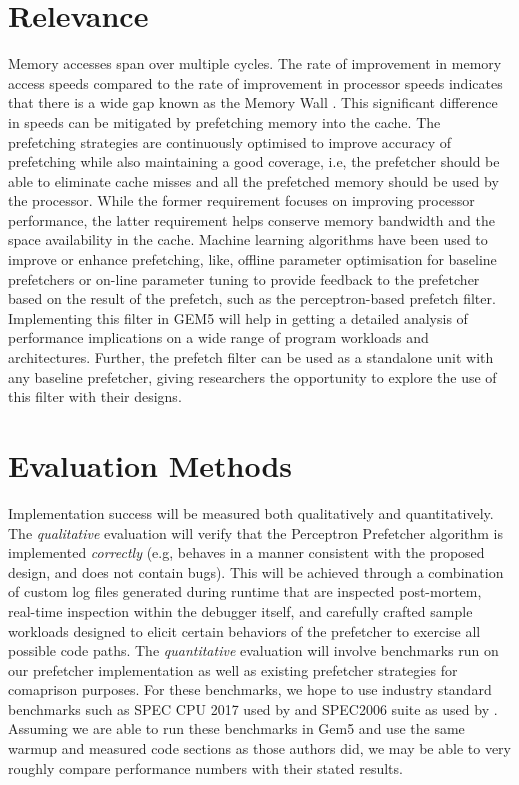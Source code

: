 \documentclass[conference]{IEEEtran}
\begin{document}
\section{Relevance}
Memory accesses span over multiple cycles. The rate of improvement in memory access speeds compared to the rate of improvement in processor speeds indicates that there is a wide gap known as the Memory Wall \cite{mem-wall}. This significant difference in speeds can be mitigated by prefetching memory into the cache. The prefetching strategies are continuously optimised to improve accuracy of prefetching while also maintaining a good coverage, i.e, the prefetcher should be able to eliminate cache misses and all the prefetched memory should be used by the processor. While the former requirement focuses on improving processor performance, the latter requirement helps conserve memory bandwidth and the space availability in the cache. Machine learning algorithms have been used to improve or enhance prefetching, like, offline parameter optimisation for baseline prefetchers or on-line parameter tuning to provide feedback to the prefetcher based on the result of the prefetch, such as the perceptron-based prefetch filter\cite{ppf}. Implementing this filter in GEM5 will help in getting a detailed analysis of performance implications on a wide range of program workloads and architectures.  Further, the prefetch filter can be used as a standalone unit with any baseline prefetcher, giving researchers the opportunity to explore the use of this filter with their designs.

\section{Evaluation Methods}

Implementation success will be measured both qualitatively and quantitatively. The \textit{qualitative} evaluation will verify that the Perceptron Prefetcher algorithm is implemented \textit{correctly} (e.g, behaves in a manner consistent with the proposed design, and does not contain bugs). This will be achieved through a combination of custom log files generated during runtime that are inspected post-mortem, real-time inspection within the debugger itself, and carefully crafted sample workloads designed to elicit certain behaviors of the prefetcher to exercise all possible code paths. The \textit{quantitative} evaluation will involve benchmarks run on our prefetcher implementation as well as existing prefetcher strategies for comaprison purposes. For these benchmarks, we hope to use industry standard benchmarks such as SPEC CPU 2017 used by \cite{ppf} and SPEC2006 suite as used by \cite{sandbox}. Assuming we are able to run these benchmarks in Gem5 and use the same warmup and measured code sections as those authors did, we may be able to very roughly compare performance numbers with their stated results. 
\end{document}
